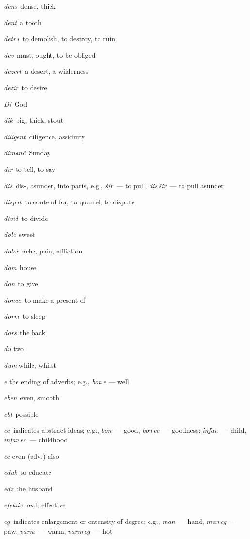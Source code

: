 \begin{landscape}
\begin{multicols}{5}
\begin{outdent}{1em}
\emph{dens\,} dense, thick

\emph{dent\,} a tooth

\emph{detru\,} to demolish, to destroy, to ruin

\emph{dev\,} must, ought, to be obliged

\emph{dezert\,} a desert, a wilderness

\emph{dezir\,} to desire

\emph{Di\,} God

\emph{dik\,} big, thick, stout

\emph{diligent\,} diligence, assiduity

\emph{dimanĉ\,} Sunday

\emph{dir\,} to tell, to say

\emph{dis\,} dis-, asunder, into parts, e.g., \emph{ŝir\,} — to pull, \emph{dis\,ŝir\,} — to pull asunder

\emph{disput\,} to contend for, to quarrel, to dispute

\emph{divid\,} to divide

\emph{dolĉ\,} sweet

\emph{dolor\,} ache, pain, affliction

\emph{dom\,} house

\emph{don\,} to give

\emph{donac\,} to make a present of

\emph{dorm\,} to sleep

\emph{dors\,} the back

\emph{du} two

\emph{dum} while, whilst
\end{outdent}


\begin{outdent}{1em}
\emph{e} the ending of adverbs; e.g., \emph{bon\,e} — well

\emph{eben\,} even, smooth

\emph{ebl\,} possible

\emph{ec\,} indicates abstract ideas; e.g., \emph{bon\,} — good, \emph{bon\,ec\,} — goodness; \emph{infan\,} — child, \emph{infan\,ec\,} — childhood

\emph{eĉ} even (adv.) also

\emph{eduk\,} to educate

\emph{edz\,} the husband

\emph{efektiv\,} real, effective

\emph{eg\,} indicates enlargement or entensity of degree; e.g., \emph{man\,} — hand, \emph{man\,eg\,} — paw; \emph{varm\,} — warm, \emph{varm\,eg\,} — hot


\end{outdent}
\end{multicols}
\end{landscape}
